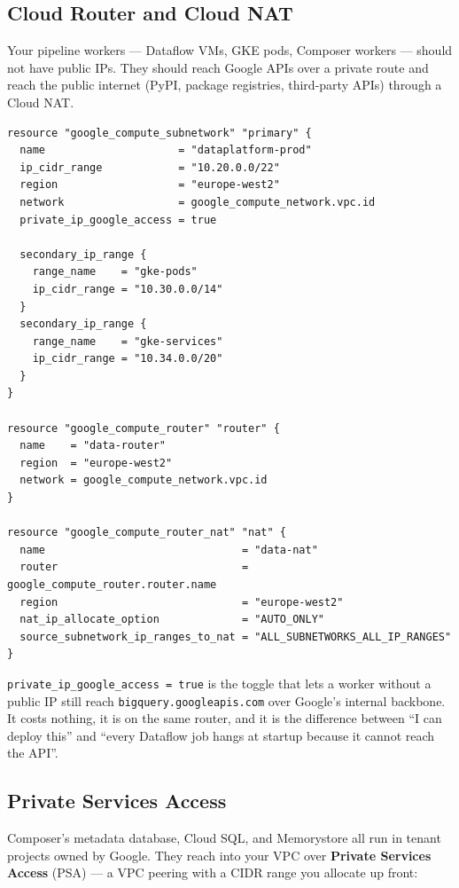 \documentclass[
  11pt,
  british,
  oneside]{book}
\begin{document}
\hypertarget{cloud-router-and-cloud-nat}{%
\subsection{Cloud Router and Cloud
NAT}\label{cloud-router-and-cloud-nat}}

Your pipeline workers --- Dataflow VMs, GKE pods, Composer workers ---
should not have public IPs. They should reach Google APIs over a private
route and reach the public internet (PyPI, package registries,
third-party APIs) through a Cloud NAT.

\begin{verbatim}
resource "google_compute_subnetwork" "primary" {
  name                     = "dataplatform-prod"
  ip_cidr_range            = "10.20.0.0/22"
  region                   = "europe-west2"
  network                  = google_compute_network.vpc.id
  private_ip_google_access = true

  secondary_ip_range {
    range_name    = "gke-pods"
    ip_cidr_range = "10.30.0.0/14"
  }
  secondary_ip_range {
    range_name    = "gke-services"
    ip_cidr_range = "10.34.0.0/20"
  }
}

resource "google_compute_router" "router" {
  name    = "data-router"
  region  = "europe-west2"
  network = google_compute_network.vpc.id
}

resource "google_compute_router_nat" "nat" {
  name                               = "data-nat"
  router                             = google_compute_router.router.name
  region                             = "europe-west2"
  nat_ip_allocate_option             = "AUTO_ONLY"
  source_subnetwork_ip_ranges_to_nat = "ALL_SUBNETWORKS_ALL_IP_RANGES"
}
\end{verbatim}

\texttt{private\_ip\_google\_access\ =\ true}
is the toggle that lets a worker without a public IP still reach
\texttt{bigquery.googleapis.com} over Google's internal backbone. It
costs nothing, it is on the same router, and it is the difference
between ``I can deploy this'' and ``every Dataflow job hangs at startup
because it cannot reach the API''.

\hypertarget{private-services-access}{%
\subsection{Private Services Access}\label{private-services-access}}

Composer's metadata database, Cloud SQL, and Memorystore all run in
tenant projects owned by Google. They reach into your VPC over
\textbf{Private Services Access} (PSA)
--- a VPC peering with a CIDR range you allocate up front:
\end{document}
